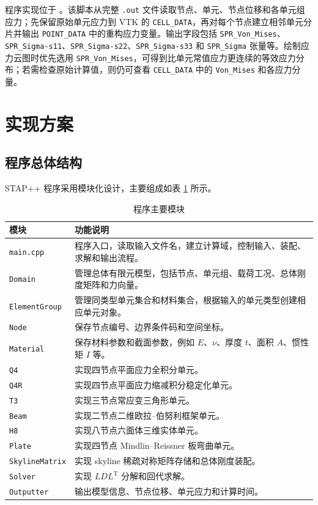 \documentclass[UTF8,a4paper,zihao=-4]{ctexart}
\newcommand{\T}{\mathrm{T}}
\begin{document}
程序实现位于 。该脚本从完整 \texttt{.out} 文件读取节点、单元、节点位移和各单元组应力；先保留原始单元应力到 VTK 的 \texttt{CELL\_DATA}，再对每个节点建立相邻单元分片并输出 \texttt{POINT\_DATA} 中的重构应力变量。输出字段包括 \texttt{SPR\_Von\_Mises}、\texttt{SPR\_Sigma-s11}、\texttt{SPR\_Sigma-s22}、\texttt{SPR\_Sigma-s33} 和 \texttt{SPR\_Sigma} 张量等。绘制应力云图时优先选用 \texttt{SPR\_Von\_Mises}，可得到比单元常值应力更连续的等效应力分布；若需检查原始计算值，则仍可查看 \texttt{CELL\_DATA} 中的 \texttt{Von\_Mises} 和各应力分量。

\section{实现方案}

\subsection{程序总体结构}

STAP++ 程序采用模块化设计，主要组成如表 \ref{tab:program_modules} 所示。

\begin{table}[H]
    \centering
    \caption{程序主要模块}
    \label{tab:program_modules}
    \begin{tabular}{p{}p{}}
        \toprule
        模块 & 功能说明\\
        \midrule
        \texttt{main.cpp} & 程序入口，读取输入文件名，建立计算域，控制输入、装配、求解和输出流程。\\
        \texttt{Domain} & 管理总体有限元模型，包括节点、单元组、载荷工况、总体刚度矩阵和力向量。\\
        \texttt{ElementGroup} & 管理同类型单元集合和材料集合，根据输入的单元类型创建相应单元对象。\\
        \texttt{Node} & 保存节点编号、边界条件码和空间坐标。\\
        \texttt{Material} & 保存材料参数和截面参数，例如 $E$、$\nu$、厚度 $t$、面积 $A$、惯性矩 $I$ 等。\\
        \texttt{Q4} & 实现四节点平面应力全积分单元。\\
        \texttt{Q4R} & 实现四节点平面应力缩减积分稳定化单元。\\
        \texttt{T3} & 实现三节点常应变三角形单元。\\
        \texttt{Beam} & 实现二节点二维欧拉--伯努利框架单元。\\
        \texttt{H8} & 实现八节点六面体三维实体单元。\\
        \texttt{Plate} & 实现四节点 Mindlin--Reissner 板弯曲单元。\\
        \texttt{SkylineMatrix} & 实现 skyline 稀疏对称矩阵存储和总体刚度装配。\\
        \texttt{Solver} & 实现 $LDL^{\T}$ 分解和回代求解。\\
        \texttt{Outputter} & 输出模型信息、节点位移、单元应力和计算时间。\\
        \bottomrule
    \end{tabular}
\end{table}
\end{document}
